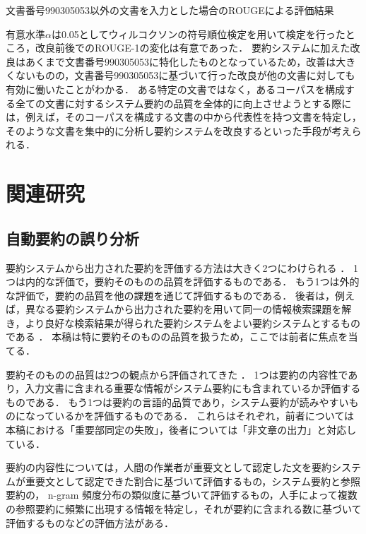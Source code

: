 \begin{table}[t]
\caption{文書番号990305053以外の文書を入力とした場合のROUGEによる評価結果}
\label{tb:文書番号990305053以外の文書を入力とした場合のROUGEによる評価結果}

\end{table}

有意水準$\alpha$は0.05としてウィルコクソンの符号順位検定\cite{wilcoxon45}を用いて検定を行ったところ，改良前後でのROUGE-1の変化は有意であった．
要約システムに加えた改良はあくまで文書番号990305053に特化したものとなっているため，改善は大きくないものの，文書番号990305053に基づいて行った改良が他の文書に対しても有効に働いたことがわかる．
ある特定の文書ではなく，あるコーパスを構成する全ての文書に対するシステム要約の品質を全体的に向上させようとする際には，例えば，そのコーパスを構成する文書の中から代表性を持つ文書を特定し，そのような文書を集中的に分析し要約システムを改良するといった手段が考えられる．


\section{関連研究}
\label{sc:関連研究}

\subsection{自動要約の誤り分析}

要約システムから出力された要約を評価する方法は大きく2つにわけられる \cite{sparck-jones07} ．
1つは内的な評価で，要約そのものの品質を評価するものである．
もう1つは外的な評価で，要約の品質を他の課題を通じて評価するものである．
後者は，例えば，異なる要約システムから出力された要約を用いて同一の情報検索課題を解き，より良好な検索結果が得られた要約システムをよい要約システムとするものである \cite{nomoto97}  ．
本稿は特に要約そのものの品質を扱うため，ここでは前者に焦点を当てる．

要約そのものの品質は2つの観点から評価されてきた \cite{nenkova11} ．
1つは要約の内容性であり，入力文書に含まれる重要な情報がシステム要約にも含まれているか評価するものである．
もう1つは要約の言語的品質であり，システム要約が読みやすいものになっているかを評価するものである．
これらはそれぞれ，前者については本稿における「重要部同定の失敗」，後者については「非文章の出力」と対応している．

要約の内容性については，人間の作業者が重要文として認定した文を要約システムが重要文として認定できた割合に基づいて評価するもの\cite{okumura05}，システム要約と参照要約の， n-gram 頻度分布の類似度に基づいて評価するもの\cite{lin04}，人手によって複数の参照要約に頻繁に出現する情報を特定し，それが要約に含まれる数に基づいて評価するもの\cite{nenkova07}などの評価方法がある．

